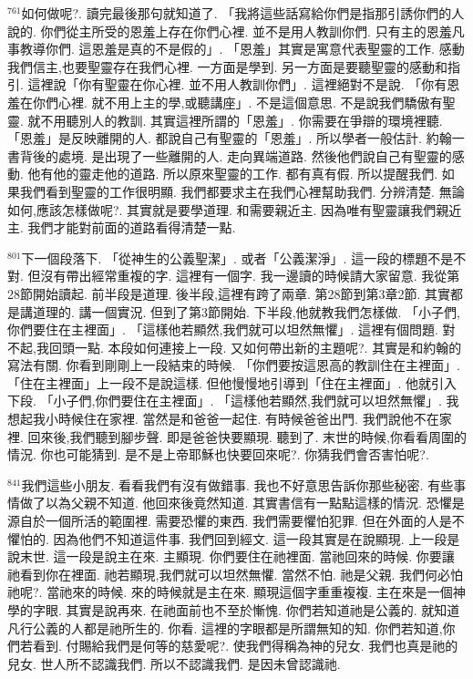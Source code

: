 \documentclass{book}
\begin{document}
$^{761}$如何做呢?.
讀完最後那句就知道了.
「我將這些話寫給你們是指那引誘你們的人說的.
你們從主所受的恩羞上存在你們心裡.
並不是用人教訓你們.
只有主的恩羞凡事教導你們.
這恩羞是真的不是假的」.
「恩羞」其實是寓意代表聖靈的工作.
感動我們信主,也要聖靈存在我們心裡.
一方面是學到.
另一方面是要聽聖靈的感動和指引.
這裡說「你有聖靈在你心裡.
並不用人教訓你們」.
這裡絕對不是說.
「你有恩羞在你們心裡.
就不用上主的學,或聽講座」.
不是這個意思.
不是說我們驕傲有聖靈.
就不用聽別人的教訓.
其實這裡所謂的「恩羞」.
你需要在爭辯的環境裡聽.
「恩羞」是反映離開的人.
都說自己有聖靈的「恩羞」.
所以學者一般估計.
約翰一書背後的處境.
是出現了一些離開的人.
走向異端道路.
然後他們說自己有聖靈的感動.
他有他的靈走他的道路.
所以原來聖靈的工作.
都有真有假.
所以提醒我們.
如果我們看到聖靈的工作很明顯.
我們都要求主在我們心裡幫助我們.
分辨清楚.
無論如何,應該怎樣做呢?.
其實就是要學道理.
和需要親近主.
因為唯有聖靈讓我們親近主.
我們才能對前面的道路看得清楚一點.

$^{801}$下一個段落下.
「從神生的公義聖潔」.
或者「公義潔淨」.
這一段的標題不是不對.
但沒有帶出經常重複的字.
這裡有一個字.
我一邊讀的時候請大家留意.
我從第28節開始讀起.
前半段是道理.
後半段,這裡有跨了兩章.
第28節到第3章2節.
其實都是講道理的.
講一個實況.
但到了第3節開始.
下半段,他就教我們怎樣做.
「小子們,你們要住在主裡面」.
「這樣他若顯然,我們就可以坦然無懼」.
這裡有個問題.
對不起,我回頭一點.
本段如何連接上一段.
又如何帶出新的主題呢?.
其實是和約翰的寫法有關.
你看到剛剛上一段結束的時候.
「你們要按這恩高的教訓住在主裡面」.
「住在主裡面」上一段不是說這樣.
但他慢慢地引導到「住在主裡面」.
他就引入下段.
「小子們,你們要住在主裡面」.
「這樣他若顯然,我們就可以坦然無懼」.
我想起我小時候住在家裡.
當然是和爸爸一起住.
有時候爸爸出門.
我們說他不在家裡.
回來後,我們聽到腳步聲.
即是爸爸快要顯現.
聽到了.
末世的時候,你看看周圍的情況.
你也可能猜到.
是不是上帝耶穌也快要回來呢?.
你猜我們會否害怕呢?.

$^{841}$我們這些小朋友.
看看我們有沒有做錯事.
我也不好意思告訴你那些秘密.
有些事情做了以為父親不知道.
他回來後竟然知道.
其實書信有一點點這樣的情況.
恐懼是源自於一個所活的範圍裡.
需要恐懼的東西.
我們需要懼怕犯罪.
但在外面的人是不懼怕的.
因為他們不知道這件事.
我們回到經文.
這一段其實是在說顯現.
上一段是說末世.
這一段是說主在來.
主顯現.
你們要住在祂裡面.
當祂回來的時候.
你要讓祂看到你在裡面.
祂若顯現,我們就可以坦然無懼.
當然不怕.
祂是父親.
我們何必怕祂呢?.
當祂來的時候.
來的時候就是主在來.
顯現這個字重重複複.
主在來是一個神學的字眼.
其實是說再來.
在祂面前也不至於慚愧.
你們若知道祂是公義的.
就知道凡行公義的人都是祂所生的.
你看.
這裡的字眼都是所謂無知的知.
你們若知道,你們若看到.
付賜給我們是何等的慈愛呢?.
使我們得稱為神的兒女.
我們也真是祂的兒女.
世人所不認識我們.
所以不認識我們.
是因未曾認識祂.
\end{document}
